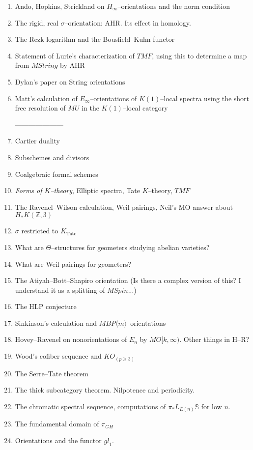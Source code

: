 \documentclass{amsart}
\newcommand{\Z}{\mathbb Z}
\renewcommand{\S}{\mathbb S}
\newcommand{\<}{\langle}
\renewcommand{\>}{\rangle}
\newcommand{\Spin}{\mathit{Spin}}
\newcommand{\String}{\mathit{String}}
\newcommand{\TMF}{\mathit{TMF}}
\newcommand{\BP}{\mathit{BP}}
\newcommand{\Tate}{\mathrm{Tate}}
\newcommand{\gl}{\mathit{gl}}
\numberwithin{equation}{section}
\theoremstyle{plain}
\theoremstyle{definition}
\theoremstyle{remark}
\begin{document}
\begin{enumerate}
\item Ando, Hopkins, Strickland on $H_\infty$--orientations and the norm condition
\item The rigid, real $\sigma$--orientation: AHR. Its effect in homology.
\item The Rezk logarithm and the Bousfield--Kuhn functor
\item Statement of Lurie's characterization of $\TMF$, using this to determine a map from $M\String$ by AHR
\item Dylan's paper on String orientations
\item Matt's calculation of $E_\infty$--orientations of $K(1)$--local spectra using the short free resolution of $MU$ in the $K(1)$--local category

---------------------
\item Cartier duality
\item Subschemes and divisors
\item Coalgebraic formal schemes
\item \textit{Forms of $K$--theory}, Elliptic spectra, Tate $K$--theory, $\TMF$
\item The Ravenel--Wilson calculation, Weil pairings, Neil's MO answer about $H_* K(\Z, 3)$
\item $\sigma$ restricted to $K_{\Tate}$
\item What are $\Theta$--structures for geometers studying abelian varieties?
\item What are Weil pairings for geometers?
\item The Atiyah--Bott--Shapiro orientation (Is there a complex version of this? I understand it as a splitting of $M\Spin$...)
\item The HLP conjecture
\item Sinkinson's calculation and $M\BP\<m\>$--orientations
\item Hovey--Ravenel on nonorientations of $E_n$ by $MO[k, \infty)$. Other things in H--R?
\item Wood's cofiber sequence and $KO_{(p \ge 3)}$
\item The Serre--Tate theorem
\item The thick subcategory theorem.  Nilpotence and periodicity.
\item The chromatic spectral sequence, computations of $\pi_* L_{E(n)} \S$ for low $n$.
\item The fundamental domain of $\pi_{GH}$
\item Orientations and the functor $\gl_1$.
\end{enumerate}
\end{document}
